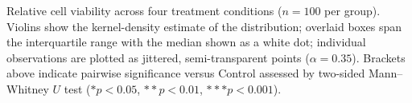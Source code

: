 \caption{Relative cell viability across four treatment conditions ($n = 100$ per group).
Violins show the kernel-density estimate of the distribution; overlaid boxes span the interquartile range with the median shown as a white dot; individual observations are plotted as jittered, semi-transparent points ($\alpha = 0.35$).
Brackets above indicate pairwise significance versus Control assessed by two-sided Mann--Whitney $U$ test
(\mbox{$* p < 0.05$}, \mbox{$** p < 0.01$}, \mbox{$*** p < 0.001$}).}
